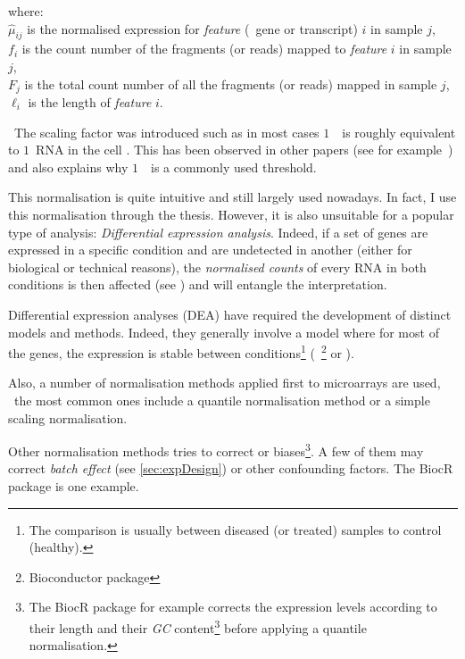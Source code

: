 where: \\{\small
$\hat{\mu}_{ij}$ is the normalised expression for \emph{feature} (\eg\ gene or
transcript) $i$ in sample $j$,\\
$f_i$ is the count number of the fragments (or reads) mapped to
\emph{feature} $i$ in sample $j$,\\
$F_j$ is the total count number of all the fragments (or reads) mapped in
sample $j$,\\
$\ell_i$ is the length of \emph{feature} $i$.
}

\NB\ The scaling factor was introduced such as in most cases $1$\ \FPKM\ is
roughly equivalent to $1$\ \gls{RNA} in the cell . This
has been observed in other papers (see for example~\cite{Hebenstreit:2011}) and
also explains why $1$\ \FPKM\ is a commonly used threshold.

This normalisation is quite intuitive and still largely used nowadays. In fact,
I use this normalisation through the thesis. However, it is also unsuitable for
a popular type of analysis: \emph{Differential expression analysis}. Indeed,
if a set of genes are expressed in a specific condition and are undetected in
another (either for biological or technical reasons), the \emph{normalised counts}
of every \gls{RNA} in both conditions is then affected (see )
and will entangle the interpretation.


Differential expression analyses (DEA)  have required the development of distinct
models and methods. Indeed, they generally involve a model where for most of the
genes, the expression is stable between conditions\footnote{The comparison is
usually between diseased (or treated) samples to control (healthy).} (\eg\
\footnote{\label{footnote:1}Bioconductor package} 
or \soft{DESeq2}\footref{footnote:1} \mycite{DESeq2}).

Also, a number of normalisation methods applied first to microarrays are used, \eg\
the most common ones include a quantile normalisation method or a simple scaling
normalisation.

Other normalisation methods tries to correct  or  biases\footnote{The \gls{BiocR} package  
for example corrects the expression levels according to their length and
their \emph{GC} content\footnote{\gls{cDNA} enriched in GC bases are stabler and
tend to a more optimal amplification.} before applying a quantile normalisation.}.
A few of them may correct \emph{batch effect} (see \cref{sec:expDesign}) or
other confounding factors. The \gls{BiocR} package \soft{RUVSeq} \mycite{ruvseq}
is one example.

